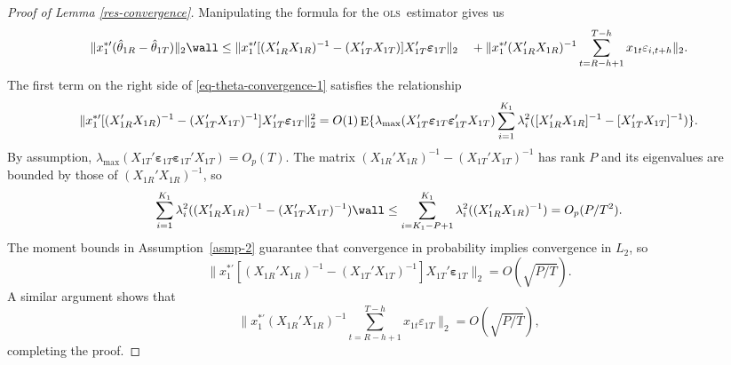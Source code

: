 \documentclass[11pt]{article}
\DeclareMathOperator{\E}{E}
\newcommand{\oosSum}[2]{\ensuremath{\sum_{#1=R-\h+#2}^{T-\h}}}
\newcommand{\h}{h}
\newcommand{\bh}[1]{\ensuremath{\hat\theta_{#1}}}
\newcommand{\ep}[1]{\ensuremath{\boldsymbol{\varepsilon}_{#1}}}
\newcommand{\ols}{\textsc{ols}}
\begin{document}
\begin{proof}[Proof of Lemma \ref{res-convergence}]
Manipulating the formula for the \ols\ estimator gives us
\begin{equation} \label{eq-theta-convergence-1}
\lVert x_1^{*\prime} (\bh{1R} - \bh{1T}) \rVert_2 \wall \leq
\lVert x_1^{*\prime} [(X_{1R}'X_{1R})^{-1} - (X_{1T}'X_{1T})]
X_{1T}'\ep{1T} \rVert_2  \\ \quad +
\lVert x_1^{*\prime} (X_{1R}'X_{1R})^{-1}\oosSum{t}{1} x_{1t}\varepsilon_{i,t+\h}
\rVert_2.
\end{equation}
The first term on the right side of \eqref{eq-theta-convergence-1}
satisfies the relationship
\[
\lVert x_{1}^{*\prime}[(X_{1R}'X_{1R})^{-1} -
(X_{1T}'X_{1T})^{-1} ]
X_{1T}'\ep{1T} \rVert_2^2 \\ = O(1)
\E\{\lambda_{\max}(X_{1T}' \ep{1T} \ep{1T}'
    X_{1T}) \sum_{i=1}^{K_1}
    \lambda_i^2([X_{1R}'X_{1R}]^{-1} -
        [X_{1T}'X_{1T}]^{-1} )\}.
\]
By assumption, $\lambda_{\max}(X_{1T}'\ep{1T} \ep{1T}' X_{1T}) =
O_p(T)$.  The matrix $(X_{1R}'X_{1R})^{-1} - (X_{1T}'X_{1T})^{-1}$ has
rank $P$ and its eigenvalues are bounded by those of
$(X_{1R}'X_{1R})^{-1}$, so
  \[\sum_{i=1}^{K_1}\lambda_i^2((X_{1R}'X_{1R})^{-1} -
  (X_{1T}'X_{1T})^{-1} )  \wall \leq
  \sum_{i=K_1 - P + 1}^{K_1}\lambda_i^2((X_{1R}'X_{1R})^{-1})  \\ = O_p(P/T^2).
  \]
The moment bounds in Assumption~\ref{asmp-2} guarantee that
convergence in probability implies convergence in $L_2$, so
  \[
    \lVert x_1^{*\prime} [(X_{1R}'X_{1R})^{-1} -
        (X_{1T}'X_{1T})^{-1} ]
      X_{1T}'\ep{1T} \rVert_2 = O(\sqrt{P/T}).
  \]
  A similar argument shows that
  \[
    \lVert x_1^{*\prime} (X_{1R}'X_{1R})^{-1}\oosSum{t}{1} x_{1t}\varepsilon_{1T}
    \rVert_2 =   O(\sqrt{P/T}),
  \]
  completing the proof.
\end{proof}
\end{document}
